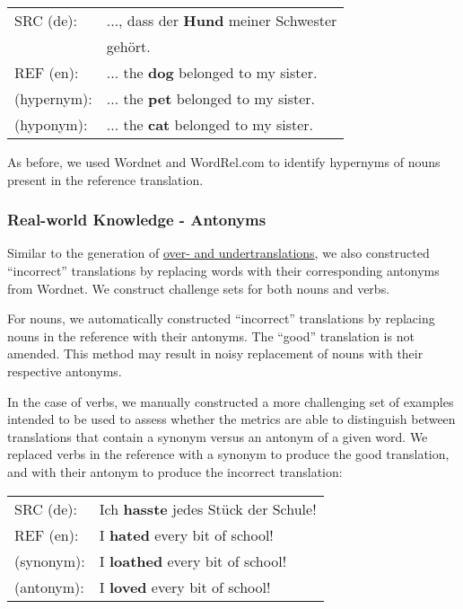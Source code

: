 \documentclass[11pt]{article}
\newcommand{\cmark}{\textcolor{darkpastelgreen}{\ding{51}}}\newcommand{\xmark}{\textcolor{darkpastelred}{\ding{55}}}
\begin{document}
\begin{small}
\vspace{0.5cm}
\setlength{\extrarowheight}{0.1cm}
\begin{tabular}{ll}
     SRC (de): & ..., dass der \textbf{Hund} meiner Schwester\\
     & gehört.\\
     REF (en): & ... the \textbf{dog} belonged to my sister.\\
     \cmark{} (hypernym): & ... the \textbf{pet} belonged to my sister.\\
     \xmark{} (hyponym): & ... the \textbf{cat} belonged to my sister.
     \vspace{0.35cm}
\end{tabular}
\end{small}

As before, we used Wordnet and WordRel.com to identify hypernyms of nouns present in the reference translation.


\subsubsection{Real-world Knowledge - Antonyms}
\label{sec:antonym}
Similar to the generation of \hyperref[sec:overtranslation_undertranslation]{over- and undertranslations}, we also constructed ``incorrect'' translations by replacing words with their corresponding antonyms from Wordnet. We construct challenge sets for both nouns and verbs.

For nouns, we automatically constructed ``incorrect'' translations by replacing nouns in the reference with their antonyms. The ``good'' translation is not amended. This method may result in noisy replacement of nouns with their respective antonyms. 

In the case of verbs, we manually constructed a more challenging set of examples intended to be used to assess whether the metrics are able to distinguish between translations that contain a synonym versus an antonym of a given word. We replaced verbs in the reference with a synonym to produce the good translation, and with their antonym to produce the incorrect translation:

\begin{small}
\vspace{0.5cm}
\setlength{\extrarowheight}{0.1cm}
\begin{tabular}{ll}
     SRC (de): & Ich \textbf{hasste} jedes Stück der Schule!\\
     REF (en): & I \textbf{hated} every bit of school!\\
     \cmark{} (synonym): & I \textbf{loathed} every bit of school!\\
     \xmark{} (antonym): & I \textbf{loved} every bit of school!
     \vspace{0.35cm}
\end{tabular}
\end{small}
\end{document}
